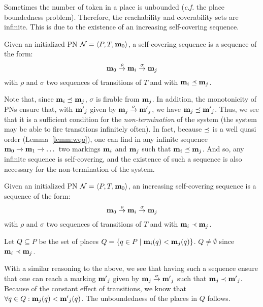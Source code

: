 


Sometimes the number of token in a place is unbounded (\textit{c.f.} the place boundedness problem).
Therefore, the reachability and coverability sets are infinite.
This is due to the existence of an increasing self-covering sequence.
\begin{defi}
  Given an initialized \ac{PN} $\mathcal{N} = \langle P,T, \mathbf{m}_0\rangle$,
  a self-covering sequence is a sequence of the form:
  \[
    \mathbf{m}_0 \stackrel{\rho}{\to} \mathbf{m}_i \stackrel{\sigma}{\to} \mathbf{m}_j
  \]
  with $\rho$ and $\sigma$ two sequences of transitions of $T$
  and with $\mathbf{m}_i \preceq \mathbf{m}_j$.
\end{defi}

Note that, since $\mathbf{m}_i \preceq \mathbf{m}_j$, $\sigma$ is firable from $\mathbf{m}_j$.
In addition, the monotonicity of \acp{PN} ensure that, with $\mathbf{m'}_j$ given by $\mathbf{m}_j \stackrel{\sigma}{\to} \mathbf{m'}_j$, we have $\mathbf{m}_j \preceq \mathbf{m'}_j$.
Thus, we see that it is a sufficient condition for the \emph{non-termination} of the system (the system may be able to fire transitions infinitely often).
In fact, because $\preceq$ is a well quasi order (Lemma~\ref{lemm:wqo}), one can find in any infinite sequence $\mathbf{m}_0 \stackrel{}{\to} \mathbf{m}_1 \stackrel{}{\to} \dots$ two markings $\mathbf{m}_i$ and $\mathbf{m}_j$ such that $\mathbf{m}_i \preceq \mathbf{m}_j$.
And so, any infinite sequence is self-covering, and the existence of such a sequence is also necessary for the non-termination of the system.

\begin{defi}
  Given an initialized \ac{PN} $\mathcal{N} = \langle P,T, \mathbf{m}_0\rangle$,
  an increasing self-covering sequence is a sequence of the form:
  \[
    \mathbf{m}_0 \stackrel{\rho}{\to} \mathbf{m}_i \stackrel{\sigma}{\to} \mathbf{m}_j
  \]
  with $\rho$ and $\sigma$ two sequences of transitions of $T$
  and with $\mathbf{m}_i \prec \mathbf{m}_j$.
\end{defi}

Let $Q \subseteq P$ be the set of places $Q = \{q \in P \mid \mathbf{m}_i(q) < \mathbf{m}_j(q)\}$.
$Q \neq \emptyset$ since $\mathbf{m}_i \prec \mathbf{m}_j$.

With a similar reasoning to the above, we see that having such a sequence ensure that one can reach a marking $\mathbf{m'}_j$ given by $\mathbf{m}_j \stackrel{\sigma}{\to} \mathbf{m'}_j$ such that $\mathbf{m}_j \prec \mathbf{m'}_j$.
Because of the constant effect of transitions, we know that $\forall q \in Q : \mathbf{m}_j(q) < \mathbf{m'}_j(q)$.
The unboundedness of the places in $Q$ follows.



